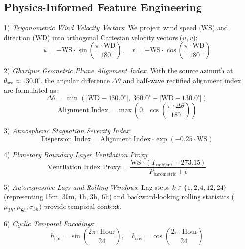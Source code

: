 \documentclass[conference]{IEEEtran}
\begin{document}
\subsection{Physics-Informed Feature Engineering}
1) \textit{Trigonometric Wind Velocity Vectors}: We project wind speed ($\text{WS}$) and direction ($\text{WD}$) into orthogonal Cartesian velocity vectors ($u, v$):
\begin{equation}
u = -\text{WS} \cdot \sin\left(\frac{\pi \cdot \text{WD}}{180}\right), \quad v = -\text{WS} \cdot \cos\left(\frac{\pi \cdot \text{WD}}{180}\right)
\end{equation}

2) \textit{Ghazipur Geometric Plume Alignment Index}: With the source azimuth at $\theta_{\text{src}} \approx 130.0^\circ$, the angular difference $\Delta\theta$ and half-wave rectified alignment index are formulated as:
\begin{equation}
\Delta\theta = \min\left( |\text{WD} - 130.0^\circ|,\; 360.0^\circ - |\text{WD} - 130.0^\circ| \right)
\end{equation}
\begin{equation}
\text{Alignment Index} = \max\left( 0,\; \cos\left(\frac{\pi \cdot \Delta\theta}{180}\right) \right)
\end{equation}

3) \textit{Atmospheric Stagnation Severity Index}:
\begin{equation}
\text{Dispersion Index} = \text{Alignment Index} \cdot \exp\left( -0.25 \cdot \text{WS} \right)
\end{equation}

4) \textit{Planetary Boundary Layer Ventilation Proxy}:
\begin{equation}
\text{Ventilation Index Proxy} = \frac{\text{WS} \cdot (T_{\text{ambient}} + 273.15)}{P_{\text{barometric}} + \epsilon}
\end{equation}

5) \textit{Autoregressive Lags and Rolling Windows}: Lag steps $k \in \{1, 2, 4, 12, 24\}$ (representing 15m, 30m, 1h, 3h, 6h) and backward-looking rolling statistics ($\mu_{3h}, \mu_{6h}, \sigma_{3h}$) provide temporal context.

6) \textit{Cyclic Temporal Encodings}:
\begin{equation}
h_{\sin} = \sin\left(\frac{2\pi \cdot \text{Hour}}{24}\right), \quad h_{\cos} = \cos\left(\frac{2\pi \cdot \text{Hour}}{24}\right)
\end{equation}
\end{document}
